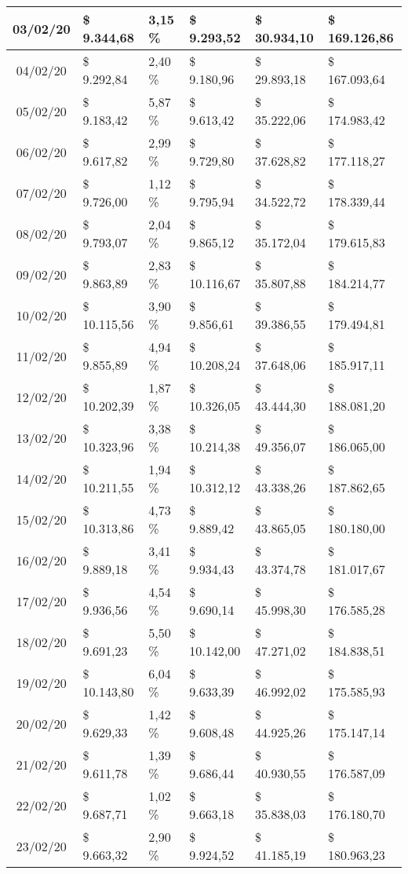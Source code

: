 \begin{small}
\begin{longtable}{|c|l|l|l|l|l|}
03/02/20 & \$ 9.344,68 & 3,15 \% & \$ 9.293,52 & \$ 30.934,10 & \$ 169.126,86 \\ \hline
04/02/20 & \$ 9.292,84 & 2,40 \% & \$ 9.180,96 & \$ 29.893,18 & \$ 167.093,64 \\ \hline
05/02/20 & \$ 9.183,42 & 5,87 \% & \$ 9.613,42 & \$ 35.222,06 & \$ 174.983,42 \\ \hline
06/02/20 & \$ 9.617,82 & 2,99 \% & \$ 9.729,80 & \$ 37.628,82 & \$ 177.118,27 \\ \hline
07/02/20 & \$ 9.726,00 & 1,12 \% & \$ 9.795,94 & \$ 34.522,72 & \$ 178.339,44 \\ \hline
08/02/20 & \$ 9.793,07 & 2,04 \% & \$ 9.865,12 & \$ 35.172,04 & \$ 179.615,83 \\ \hline
09/02/20 & \$ 9.863,89 & 2,83 \% & \$ 10.116,67 & \$ 35.807,88 & \$ 184.214,77 \\ \hline
10/02/20 & \$ 10.115,56 & 3,90 \% & \$ 9.856,61 & \$ 39.386,55 & \$ 179.494,81 \\ \hline
11/02/20 & \$ 9.855,89 & 4,94 \% & \$ 10.208,24 & \$ 37.648,06 & \$ 185.917,11 \\ \hline
12/02/20 & \$ 10.202,39 & 1,87 \% & \$ 10.326,05 & \$ 43.444,30 & \$ 188.081,20 \\ \hline
13/02/20 & \$ 10.323,96 & 3,38 \% & \$ 10.214,38 & \$ 49.356,07 & \$ 186.065,00 \\ \hline
14/02/20 & \$ 10.211,55 & 1,94 \% & \$ 10.312,12 & \$ 43.338,26 & \$ 187.862,65 \\ \hline
15/02/20 & \$ 10.313,86 & 4,73 \% & \$ 9.889,42 & \$ 43.865,05 & \$ 180.180,00 \\ \hline
16/02/20 & \$ 9.889,18 & 3,41 \% & \$ 9.934,43 & \$ 43.374,78 & \$ 181.017,67 \\ \hline
17/02/20 & \$ 9.936,56 & 4,54 \% & \$ 9.690,14 & \$ 45.998,30 & \$ 176.585,28 \\ \hline
18/02/20 & \$ 9.691,23 & 5,50 \% & \$ 10.142,00 & \$ 47.271,02 & \$ 184.838,51 \\ \hline
19/02/20 & \$ 10.143,80 & 6,04 \% & \$ 9.633,39 & \$ 46.992,02 & \$ 175.585,93 \\ \hline
20/02/20 & \$ 9.629,33 & 1,42 \% & \$ 9.608,48 & \$ 44.925,26 & \$ 175.147,14 \\ \hline
21/02/20 & \$ 9.611,78 & 1,39 \% & \$ 9.686,44 & \$ 40.930,55 & \$ 176.587,09 \\ \hline
22/02/20 & \$ 9.687,71 & 1,02 \% & \$ 9.663,18 & \$ 35.838,03 & \$ 176.180,70 \\ \hline
23/02/20 & \$ 9.663,32 & 2,90 \% & \$ 9.924,52 & \$ 41.185,19 & \$ 180.963,23 \\ \hline

\end{longtable}
\end{small}
